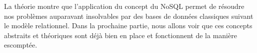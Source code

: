 La théorie montre que l'application du concept du NoSQL permet de résoudre nos problèmes auparavant insolvables par des bases de données classiques suivant le modèle relationnel. Dans la prochaine partie, nous allons voir que ces concepts abstraits et théoriques sont déjà bien en place et fonctionnent de la manière escomptée.
